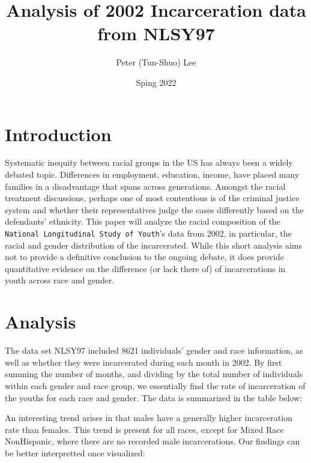 \documentclass{article}
\author{Peter (Tun-Shuo) Lee }
\title{Analysis of 2002 Incarceration data from NLSY97}
\date{Sping 2022}
\begin{document}
\maketitle

\section{Introduction}

Systematic inequity between racial groups in the US has always been a widely debated topic. Differences in employment, education, income, have placed 
many families in a disadvantage that spans across generations. Amongst the racial treatment discussions, perhaps one of most contentious is of the criminal 
justice system and whether their representatives judge the cases differently based on the defendants' ethnicity. This paper will analyze the racial composition 
of the \texttt{National Longitudinal Study of Youth}'s data from 2002, in particular, the racial and gender distribution of the incarcerated. While this short analysis aims not to provide
a definitive conclusion to the ongoing debate, it does provide quantitative evidence on the difference (or lack there of) of incarcerations in youth across race and gender.  

\newpage

\section{Analysis}

The data set NLSY97 included 8621 individuals' gender and race information, as well as whether they were incarcerated during each month in 2002. 
By first summing the number of months, and dividing by the total number of individuals within each gender and race group, we essentially find the 
rate of incarceration of the youths for each race and gender. The data is summarized in the table below: 



An interesting trend arises in that males have a generally higher incarceration rate than females. This trend is present for all races, except for Mixed Race NonHispanic, where there are no recorded 
male incarcerations. Our findings can be better interpretted once visualized: 
\end{document}
